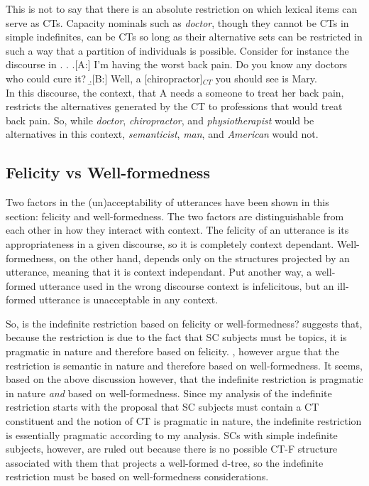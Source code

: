 \documentclass[GPFinal]{subfiles}
\begin{document}
This is not to say that there is an absolute restriction on which lexical items can serve as CTs.
Capacity nominals such as \textit{doctor}, though they cannot be CTs in simple indefinites, can be CTs so long as their alternative sets can be restricted in such a way that a partition of individuals is possible.
Consider for instance the discourse in \Next.
\ex.
\a.[A:] I'm having the worst back pain. Do you know any doctors who could cure it?
\b.[B:] Well, a [chiropractor]$_{CT}$ you should see is Mary.\\

In this discourse, the context, that A needs a someone to treat her back pain, restricts the alternatives generated by the CT to professions that would treat back pain.
So, while \textit{doctor}, \textit{chiropractor}, and \textit{physiotherapist} would be alternatives in this context, \textit{semanticist}, \textit{man}, and \textit{American} would not.


\subsection{Felicity vs Well-formedness}
Two factors in the (un)acceptability of utterances have been shown in this section: felicity and well-formedness.
The two factors are distinguishable from each other in how they interact with context.
The felicity of an utterance is its appropriateness in a given discourse, so it is completely context dependant.
Well-formedness, on the other hand, depends only on the structures projected by an utterance, meaning that it is context independant.
Put another way, a well-formed utterance used in the wrong discourse context is infelicitous, but an ill-formed utterance is unacceptable in any context.

So, is the indefinite restriction based on felicity or well-formedness?
\textcite{mikkelsen2004specifying} suggests that, because the restriction is due to the fact that SC subjects must be topics, it is pragmatic in nature and therefore based on felicity.
\textcite{heycockkroch1999pseudocleft,heycock2012specification}, however argue that the restriction is semantic in nature and therefore based on well-formedness.
It seems, based on the above discussion however, that the indefinite restriction is pragmatic in nature \textit{and} based on well-formedness.
Since my analysis of the indefinite restriction starts with the proposal that SC subjects must contain a CT constituent and the notion of CT is pragmatic in nature, the indefinite restriction is essentially pragmatic according to my analysis.
SCs with simple indefinite subjects, however, are ruled out because there is no possible CT-F structure associated with them that projects a well-formed d-tree, so the indefinite restriction must be based on well-formedness considerations.
\end{document}
